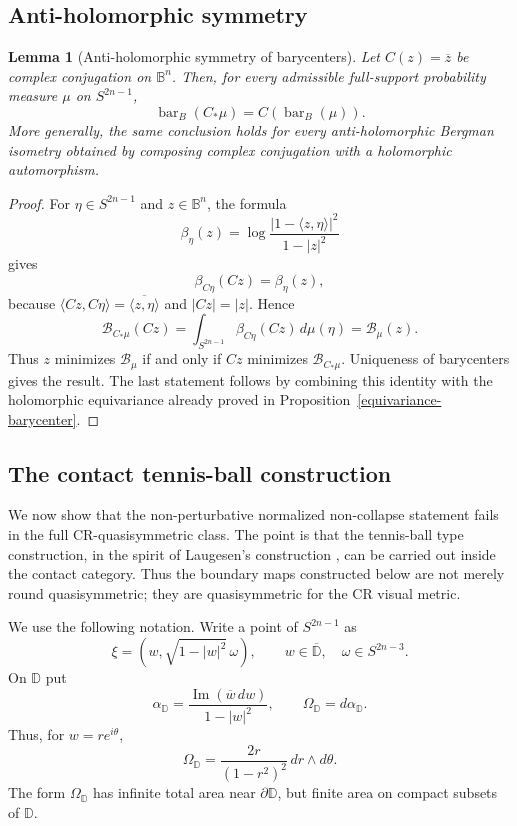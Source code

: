 \documentclass[11pt]{article}
\newtheorem{lemma}[theorem]{Lemma}
\theoremstyle{definition}
\theoremstyle{remark}
\theoremstyle{definition}
\newcommand{\B}{\mathbb B}
\newcommand{\D}{\mathbb D}
\newcommand{\barB}{\operatorname{bar}_{B}}
\begin{document}
\subsection{Anti-holomorphic symmetry}

\begin{lemma}[Anti-holomorphic symmetry of barycenters]
\label{lemma-antiholomorphic-barycenter-symmetry}
Let \(C(z)=\overline z\) be complex conjugation on \(\B^n\).  Then, for every
admissible full-support probability measure \(\mu\) on \(S^{2n-1}\),
\[
        \barB(C_*\mu)=C(\barB(\mu)).
\]
More generally, the same conclusion holds for every anti-holomorphic Bergman
isometry obtained by composing complex conjugation with a holomorphic
automorphism.
\end{lemma}

\begin{proof}
For \(\eta\in S^{2n-1}\) and \(z\in\B^n\), the formula
\[
        \beta_\eta(z)
        =\log\frac{|1-\langle z,\eta\rangle|^2}{1-|z|^2}
\]
gives
\[
        \beta_{C\eta}(Cz)=\beta_\eta(z),
\]
because \(\langle Cz,C\eta\rangle=\overline{\langle z,\eta\rangle}\) and
\(|Cz|=|z|\).  Hence
\[
        \mathcal B_{C_*\mu}(Cz)
        =\int_{S^{2n-1}}\beta_{C\eta}(Cz)\,d\mu(\eta)
        =\mathcal B_\mu(z).
\]
Thus \(z\) minimizes \(\mathcal B_\mu\) if and only if \(Cz\) minimizes
\(\mathcal B_{C_*\mu}\).  Uniqueness of barycenters gives the result.  The
last statement follows by combining this identity with the holomorphic
equivariance already proved in Proposition~\ref{equivariance-barycenter}.
\end{proof}


\subsection{The contact tennis-ball construction}

We now show that the non-perturbative normalized non-collapse statement fails
in the full CR-quasisymmetric class.  The point is that the tennis-ball type
construction, in the spirit of Laugesen's construction \cite{Laugesen1996},
can be carried out inside the contact category.  Thus the boundary maps
constructed below are not merely round quasisymmetric; they are quasisymmetric
for the CR visual metric.

We use the following notation.  Write a point of \(S^{2n-1}\) as
\[
        \xi=(w,\sqrt{1-|w|^2}\,\omega),
        \qquad
        w\in\overline{\D},\quad \omega\in S^{2n-3}.
\]
On \(\D\) put
\[
        \alpha_{\D}
        =
        \frac{\operatorname{Im}(\overline w\,dw)}{1-|w|^2},
        \qquad
        \Omega_{\D}=d\alpha_{\D}.
\]
Thus, for \(w=re^{i\theta}\),
\[
        \Omega_{\D}
        =
        \frac{2r}{(1-r^2)^2}\,dr\wedge d\theta.
\]
The form \(\Omega_{\D}\) has infinite total area near \(\partial\D\), but finite
area on compact subsets of \(\D\).
\end{document}
